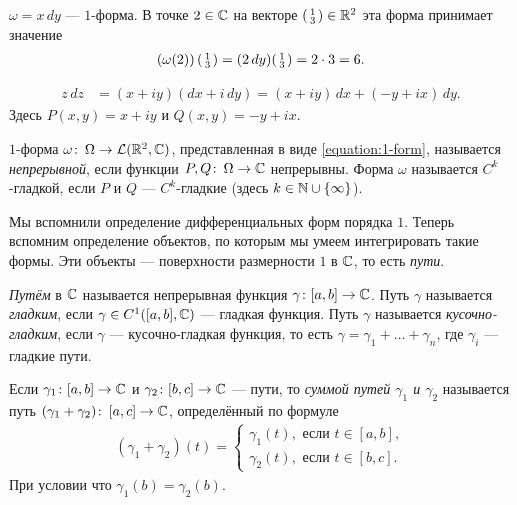 \documentclass[../complex-analysis.tex]{subfiles}
\begin{document}
\begin{exmpl*}
 $\omega = x \, dy$ --- $1$-форма. В точке $2 \in \mathbb{C}$ на векторе $ \begin{psmallmatrix}
  1 \\ 3
 \end{psmallmatrix} \in \mathbb{R}^{2}$ эта форма принимает значение
 \begin{align*}
  \left(\omega (2)\right) \begin{psmallmatrix}
   1 \\ 3
   \end{psmallmatrix}= (2 \, dy) \begin{psmallmatrix}
   1 \\ 3
  \end{psmallmatrix} = 2 \cdot 3 = 6
 .\end{align*} 
\end{exmpl*}
\begin{exmpl*}
 \begin{align*}
  z\,dz &= (x + iy)(dx + i\,dy) = (x + iy)\,dx + (-y +ix)\,dy
 .\end{align*} Здесь $P(x,y) = x + iy$ и $Q(x,y) = -y + ix$.
\end{exmpl*}
\begin{df*}
 $1$-форма $\omega \colon\, \Omega \to \mathcal{L}(\mathbb{R}^2, \mathbb{C})$, представленная в виде \eqref{equation:1-form}, называется \textit{непрерывной}, если функции $P,Q \colon\, \Omega \to \mathbb{C}$ непрерывны. Форма $\omega$ называется $C^{k}$-гладкой, если $P$ и $Q$ --- $C^{k}$-гладкие (здесь $k \in \mathbb{N} \cup \left\{ \infty \right\}$).
\end{df*}

Мы вспомнили определение дифференциальных форм порядка $1$. Теперь вспомним определение объектов, по которым мы умеем интегрировать такие формы. Эти объекты --- поверхности размерности $1$ в $\mathbb{C}$, то есть \textit{пути}.

\begin{df*}
 \textit{Путём} в $\mathbb{C}$ называется непрерывная функция $\gamma \colon [a,b] \to \mathbb{C}$. Путь $\gamma$ называется \textit{гладким}, если $\gamma \in C^{1}([a,b],\mathbb{C})$ --- гладкая функция. Путь $\gamma$ называется \textit{кусочно-гладким}, если $\gamma$ --- кусочно-гладкая функция, то есть $\gamma = \gamma_1 + \ldots + \gamma_n$, где $\gamma_i$ --- гладкие пути.
\end{df*}

\begin{df*}
 Если $\gamma_1 \colon [a,b] \to \mathbb{C}$ и $\gamma_2 \colon [b,c] \to \mathbb{C}$ --- пути, то \textit{суммой путей $\gamma_1$ и $\gamma_2$} называется путь $(\gamma_1 + \gamma_2)\colon\, [a,c] \to \mathbb{C}$, определённый по формуле
 \begin{align*}
  (\gamma_1 + \gamma_2)(t) = \begin{cases}
   \gamma_1(t), \text{ если } t \in [a,b],  \\
   \gamma_2(t), \text{ если } t \in [b,c].
  \end{cases} 
\end{align*} При условии что $\gamma_1(b) = \gamma_2(b)$.
\end{df*}
\end{document}
